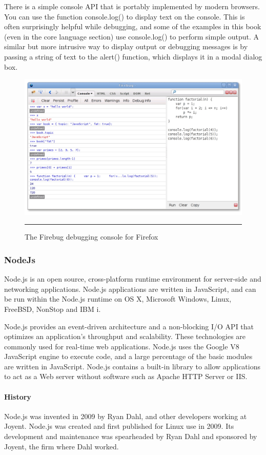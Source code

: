 There is a simple console API that is portably implemented by modern browsers. You
can use the function console.log() to display text on the console. This is often surprisingly
helpful while debugging, and some of the examples in this book (even in the
core language section) use console.log() to perform simple output. A similar but more
intrusive way to display output or debugging messages is by passing a string of text to
the alert() function, which displays it in a modal dialog box.
\begin{figure}[h!]
  \centering
    \includegraphics[width=\textwidth]{./Pictures/firebug.jpg}
  \rule{1\textwidth}{1pt}
 \caption{The Firebug debugging console for Firefox}
 \label{fig:Firebug}
\end{figure}


\subsubsection{NodeJs}
Node.js is an open source, cross-platform runtime environment for server-side and networking applications. Node.js applications are written in JavaScript, and can be run within the Node.js runtime on OS X, Microsoft Windows, Linux, FreeBSD, NonStop and IBM i.

Node.js provides an event-driven architecture and a non-blocking I/O API that optimizes an application's throughput and scalability. These technologies are commonly used for real-time web applications.
Node.js uses the Google V8 JavaScript engine to execute code, and a large percentage of the basic modules are written in JavaScript. Node.js contains a built-in library to allow applications to act as a Web server without software such as Apache HTTP Server or IIS.
\paragraph*{History}
\hfill \break
Node.js was invented in 2009 by Ryan Dahl, and other developers working at Joyent. Node.js was created and first published for Linux use in 2009. Its development and maintenance was spearheaded by Ryan Dahl and sponsored by Joyent, the firm where Dahl worked.


